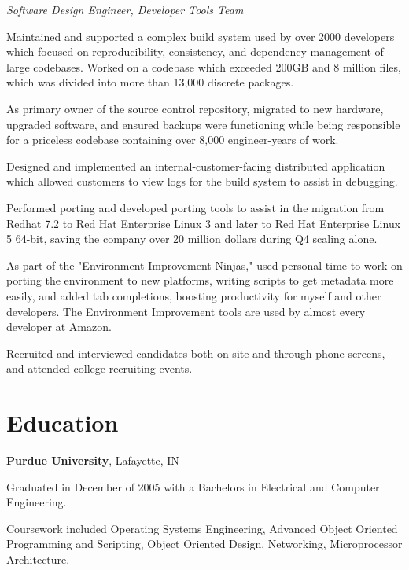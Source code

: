 \documentclass[margin,line]{resume}
\begin{document}
\begin{resume}
	\vspace{1mm} \vspace{1mm}%
	{\sl Software Design Engineer, Developer Tools Team} %
	\begin{list2}
		\vspace*{1mm}
	\item
		Maintained and supported a complex build system used by over 2000 developers
		which focused on reproducibility, consistency, and dependency management of
		large codebases.  Worked on a codebase which exceeded 200GB and 8 million
		files, which was divided into more than 13,000 discrete packages.
	\item
		As primary owner of the source control repository, migrated to
                new hardware, upgraded software, and ensured backups were
                functioning while being responsible for a priceless codebase
                containing over 8,000 engineer-years of work.
	\item
		Designed and implemented an internal-customer-facing distributed application
		which allowed customers to view logs for the build system to assist in
		debugging.
	\item
		Performed porting and developed porting tools to assist in the migration from
		Redhat 7.2 to Red Hat Enterprise Linux 3 and later to Red Hat
		Enterprise Linux 5 64-bit, saving the company over 20 million
                dollars during Q4 scaling alone.
	\item
		As part of the "Environment Improvement Ninjas," used personal time to
		work on porting the environment to new platforms, writing scripts to
		get metadata more easily, and added tab completions, boosting
		productivity for myself and other developers.  The Environment
		Improvement tools are used by almost every developer at Amazon.
	\item
		Recruited and interviewed candidates both on-site and through phone
		screens, and attended college recruiting events.
	\end{list2}

	\section{\mysidestyle Education}

	{\bf Purdue University}, Lafayette, IN \vspace{2mm}
	\begin{list2}
		\vspace*{1mm}
	\item
		Graduated in December of 2005 with a Bachelors in Electrical and
		Computer Engineering.
	\item
		Coursework included Operating Systems Engineering, Advanced Object Oriented
		Programming and Scripting, Object Oriented Design, Networking, Microprocessor
		Architecture.
	\end{list2}


\end{resume}
\end{document}
